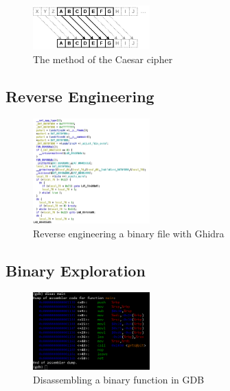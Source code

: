 \documentclass[conference]{IEEEtran}
\begin{document}
\begin{figure}[htbp]
	\centering
	\includegraphics[width=0.4\textwidth]{fig/caesar.png}
	\caption{The method of the Caesar cipher}
	\label{fig-caesar}
\end{figure}

\cite{morkel2005}



\subsection{Reverse Engineering}

\begin{figure}[htbp]
	\centering
	\includegraphics[width=0.4\textwidth]{fig/ghidra.png}
	\caption{Reverse engineering a binary file with Ghidra}
	\label{fig-ghidra}
\end{figure}

\cite{eagle2020}

\subsection{Binary Exploration}

\begin{figure}[htbp]
	\centering
	\includegraphics[width=0.4\textwidth]{fig/gdb.png}
	\caption{Disassembling a binary function in GDB}
	\label{fig-gdb}
\end{figure}
\end{document}
